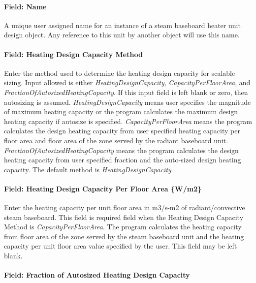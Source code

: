 \paragraph{Field: Name}\label{steam-baseboard-design-name}

A unique user assigned name for an instance of a steam baseboard heater unit design object. Any reference to this unit by another object will use this name.

\paragraph{Field: Heating Design Capacity Method}\label{field-heating-design-capacity-method-1-000}

Enter the method used to determine the heating design capacity for scalable sizing. Input allowed is either \emph{HeatingDesignCapacity}, \emph{CapacityPerFloorArea}, and \emph{FractionOfAutosizedHeatingCapacity}. If this input field is left blank or zero, then autosizing is assumed. \emph{HeatingDesignCapacity} means user specifies the magnitude of maximum heating capacity or the program calculates the maximum design heating capacity if autosize is specified. \emph{CapacityPerFloorArea} means the program calculates the design heating capacity from user specified heating capacity per floor area and floor area of the zone served by the radiant baseboard unit. \emph{FractionOfAutosizedHeatingCapacity} means the program calculates the design heating capacity from user specified fraction and the auto-sized design heating capacity. The default method is \emph{HeatingDesignCapacity}.

\paragraph{Field: Heating Design Capacity Per Floor Area \{W/m2\}}\label{field-heating-design-capacity-per-floor-area-wm2-1-000}

Enter the heating capacity per unit floor area in m3/s-m2 of radiant/convective steam baseboard. This field is required field when the Heating Design Capacity Method is \emph{CapacityPerFloorArea}. The program calculates the heating capacity from floor area of the zone served by the steam baseboard unit and the heating capacity per unit floor area value specified by the user. This field may be left blank.

\paragraph{Field: Fraction of Autosized Heating Design Capacity}\label{field-fraction-of-autosized-heating-design-capacity-1-000}

